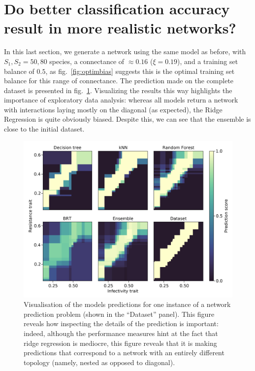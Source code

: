 \documentclass[11pt]{article}
\makeatletter
\def\maxwidth{\ifdim\Gin@nat@width>\linewidth\linewidth
\else\Gin@nat@width\fi}
\let\Oldincludegraphics\includegraphics
\renewcommand{\includegraphics}[1]{\Oldincludegraphics[width=\maxwidth]{#1}}
\makeatother
\begin{document}
\hypertarget{do-better-classification-accuracy-result-in-more-realistic-networks}{%
\section{Do better classification accuracy result in more realistic
networks?}\label{do-better-classification-accuracy-result-in-more-realistic-networks}}

In this last section, we generate a network using the same model as
before, with \(S_1, S_2 = 50, 80\) species, a connectance of
\(\approx 0.16\) (\(\xi = 0.19\)), and a training set balance of
\(0.5\), as fig.~\ref{fig:optimbias} suggests this is the optimal
training set balance for this range of connectance. The prediction made
on the complete dataset is presented in fig.~\ref{fig:ecovalid}.
Visualizing the results this way highlights the importance of
exploratory data analysis: whereas all models return a network with
interactions laying mostly on the diagonal (as expected), the Ridge
Regression is quite obviously biased. Despite this, we can see that the
ensemble is close to the initial dataset.

\begin{figure}
\hypertarget{fig:ecovalid}{%
\centering
\includegraphics{figures/valid_ensemble.png}
\caption{Visualisation of the models predictions for one instance of a
network prediction problem (shown in the ``Dataset'' panel). This figure
reveals how inspecting the details of the prediction is important:
indeed, although the performance measures hint at the fact that ridge
regression is mediocre, this figure reveals that it is making
predictions that correspond to a network with an entirely different
topology (namely, nested as opposed to diagonal).}\label{fig:ecovalid}
}
\end{figure}
\end{document}
